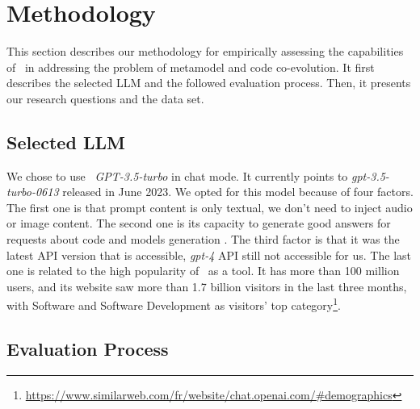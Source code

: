 \section{Methodology}
\label{ch3_evaluation}

This section describes our methodology for empirically assessing the capabilities of \LLM~in addressing the problem of metamodel and code co-evolution. 
It first describes the selected LLM and the followed evaluation process.
Then, it presents our research questions and the data set.

\subsection{Selected LLM}\label{selectedLLM}

We chose to use \LLM~\emph{GPT-3.5-turbo} in chat mode. It currently points to \emph{gpt-3.5-turbo-0613} released in June 2023. We opted for this model because of four factors. The first one is that prompt content is only textual, we don't need to inject audio or image content. The second one is its capacity to generate good answers for requests about code and models generation \cite{nathalia2023artificial,yeticstiren2023evaluating,guo2023exploring,fu2023chatgpt,kabir2023empirical,chaaben2023towards,camara2023assessment}. The third factor is that it was the latest API version that is accessible, \emph{gpt-4} API still not accessible for us. The last one is related to the high popularity of \LLM~as a tool. It has more than 100 million users, and its website saw more than 1.7 billion visitors in the last three months, with Software and Software Development as visitors' top category\footnote{\url{https://www.similarweb.com/fr/website/chat.openai.com/\#demographics}}. 


\subsection{Evaluation Process}


